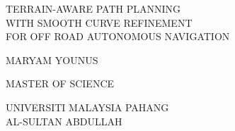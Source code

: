 \begin{titlepage}
\begin{center}
\vspace*{3cm}

{\fontsize{20}{24}\selectfont TERRAIN-AWARE PATH PLANNING\\
WITH SMOOTH CURVE REFINEMENT\\
FOR OFF ROAD AUTONOMOUS NAVIGATION\par}

\vspace{5cm}

{\large MARYAM YOUNUS}

\vfill

{\large MASTER OF SCIENCE}

\vspace{1cm}

{\large UNIVERSITI MALAYSIA PAHANG\\
AL-SULTAN ABDULLAH}

\vspace{2cm}
\end{center}
\end{titlepage}
